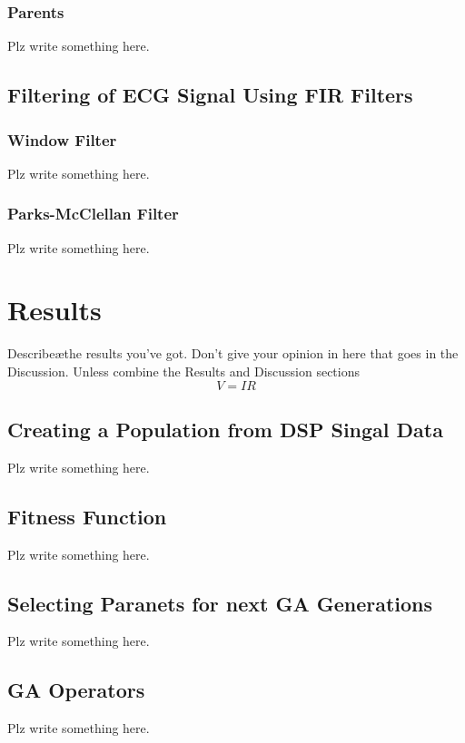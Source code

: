 \documentclass[a4paper, 11pt]{article}
\begin{document}
        \subsubsection{Parents}
            Plz write something here.

    \subsection{Filtering of ECG Signal Using FIR Filters}\label{sec:meth_sub5}
        \subsubsection{Window Filter}
            Plz write something here.

        \subsubsection{Parks-McClellan Filter}
            Plz write something here.


\section{Results}\label{sec:res}
    Describe\ae the results you've got. Don't give your opinion in here that goes in the Discussion.
    Unless combine the Results and Discussion sections \begin{equation} V = IR\end{equation}

    \subsection{Creating a Population from DSP Singal Data}\label{sec:meth_sub1}
    Plz write something here.
    \subsection{Fitness Function}\label{sec:meth_sub2}
    Plz write something here.
    \subsection{Selecting Paranets for next GA Generations}\label{sec:meth_sub3}
    Plz write something here.
    \subsection{GA Operators}\label{sec:meth_sub4}
    Plz write something here.
\end{document}
